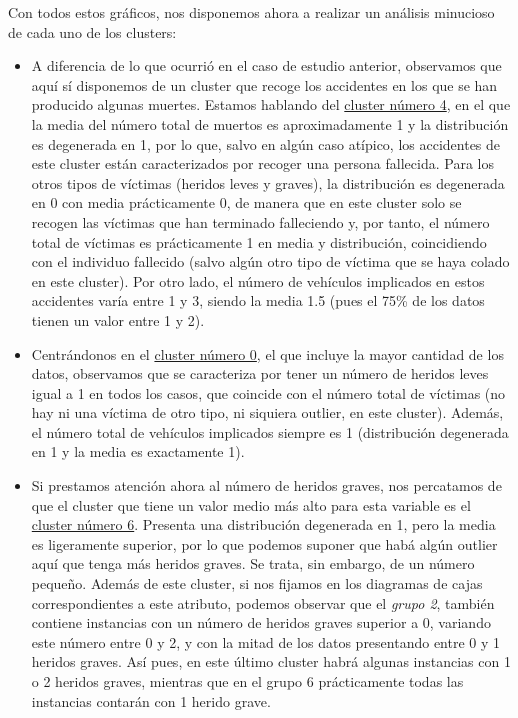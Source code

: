 \documentclass[a4paper,11pt]{book}
\begin{document}
Con todos estos gráficos, nos disponemos ahora a realizar un análisis minucioso de cada uno de los clusters:
\begin{itemize}
	\item A diferencia de lo que ocurrió en el caso de estudio anterior, observamos que aquí sí disponemos de un cluster que recoge los accidentes en los que se han producido algunas muertes. Estamos hablando del \underline{cluster número 4}, en el que la media del número total de muertos es aproximadamente 1 y la distribución es degenerada en 1, por lo que, salvo en algún caso atípico, los accidentes de este cluster están caracterizados por recoger una persona fallecida. Para los otros tipos de víctimas (heridos leves y graves), la distribución es degenerada en 0 con media prácticamente 0, de manera que en este cluster solo se recogen las víctimas que han terminado falleciendo y, por tanto, el número total de víctimas es prácticamente 1 en media y distribución, coincidiendo con el individuo fallecido (salvo algún otro tipo de víctima que se haya colado en este cluster). Por otro lado, el número de vehículos implicados en estos accidentes varía entre 1 y 3, siendo la media 1.5 (pues el 75\% de los datos tienen un valor entre 1 y 2). 
	
	\item Centrándonos en el \underline{cluster número 0}, el que incluye la mayor cantidad de los datos, observamos que se caracteriza por tener un número de heridos leves igual a 1 en todos los casos, que coincide con el número total de víctimas (no hay ni una víctima de otro tipo, ni siquiera outlier, en este cluster). Además, el número total de vehículos implicados siempre es 1 (distribución degenerada en 1 y la media es exactamente 1).
	\item Si prestamos atención ahora al número de heridos graves, nos percatamos de que el cluster que tiene un valor medio más alto para esta variable es el \underline{cluster número 6}. Presenta una distribución degenerada en 1, pero la media es ligeramente superior, por lo que podemos suponer que habá algún outlier aquí que tenga más heridos graves. Se trata, sin embargo, de un número pequeño. Además de este cluster, si nos fijamos en los diagramas de cajas correspondientes a este atributo, podemos observar que el \textit{grupo 2}, también contiene instancias con un número de heridos graves superior a 0, variando este número entre 0 y 2, y con la mitad de los datos presentando entre 0 y 1 heridos graves. Así pues, en este último cluster habrá algunas instancias con 1 o 2 heridos graves, mientras que en el grupo 6 prácticamente todas las instancias contarán con 1 herido grave. 
	

\end{itemize}
\end{document}
